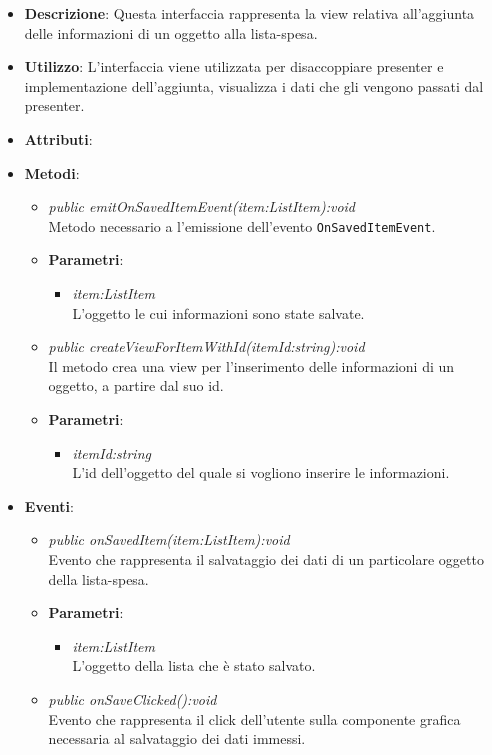 \begin{itemize}
\item \textbf{Descrizione}: Questa interfaccia rappresenta la view relativa all'aggiunta delle informazioni di un oggetto alla lista-spesa.
\item \textbf{Utilizzo}: L'interfaccia viene utilizzata per disaccoppiare presenter e implementazione dell'aggiunta, visualizza i dati che gli vengono passati dal presenter.
\item \textbf{Attributi}:
\item \textbf{Metodi}:
	\begin{itemize}
	\item \textit{public emitOnSavedItemEvent(item:ListItem):void}\\
	Metodo necessario a l'emissione dell'evento \texttt{OnSavedItemEvent}.
			\item{\textbf{Parametri}: \begin{itemize}
			\item \textit{item:ListItem}\\
			L'oggetto le cui informazioni sono state salvate.
			\end{itemize}}
	\item \textit{public createViewForItemWithId(itemId:string):void}\\
	Il metodo crea una view per l'inserimento delle informazioni di un oggetto, a partire dal suo id.
			\item{\textbf{Parametri}: \begin{itemize}
			\item \textit{itemId:string}\\
			L'id dell'oggetto del quale si vogliono inserire le informazioni.
			\end{itemize}}
	\end{itemize}
\item \textbf{Eventi}:
\begin{itemize}
\item \textit{public onSavedItem(item:ListItem):void}\\
Evento che rappresenta il salvataggio dei dati di un particolare oggetto della lista-spesa.
			\item{\textbf{Parametri}: \begin{itemize}
			\item \textit{item:ListItem}\\
			L'oggetto della lista che è stato salvato.
			\end{itemize}}
\item \textit{public onSaveClicked():void}\\
Evento che rappresenta il click dell'utente sulla componente grafica necessaria al salvataggio dei dati immessi.
\end{itemize}
\end{itemize}

